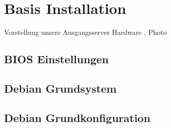 \chapter{Basis Installation}  %
\label{Basis Installation}  %

Vorstellung unsers Ausgangsserver
Hardware , Photo 

\section{BIOS Einstellungen}
\label{section:BIOS Einstellungen}


\section{Debian Grundsystem}
\label{section:Debian Grundsystem}


\section{Debian Grundkonfiguration}
\label{section:Debian Grundkonfiguration}


